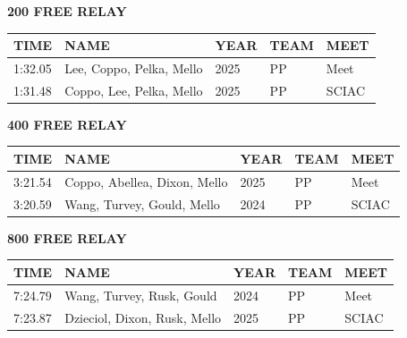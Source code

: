 \begin{table}[H]
\centering
\begin{minipage}[t]{0.6\textwidth}
\centering
\textbf{200 FREE RELAY}\\[0.1cm]
\begin{tabular}{@{}p{1.8cm}p{2.8cm}p{1.2cm}p{1.4cm}p{1.4cm}@{}}
\hline
    \textbf{TIME} & \textbf{NAME} & \textbf{YEAR} & \textbf{TEAM} & \textbf{MEET} \\
\hline
    1:32.05 & Lee, Coppo, Pelka, Mello & 2025 & PP & Meet \\
    1:31.48 & Coppo, Lee, Pelka, Mello & 2025 & PP & SCIAC \\
\hline
\end{tabular}
\end{minipage}
\end{table}

\begin{table}[H]
\centering
\begin{minipage}[t]{0.6\textwidth}
\centering
\textbf{400 FREE RELAY}\\[0.1cm]
\begin{tabular}{@{}p{1.8cm}p{2.8cm}p{1.2cm}p{1.4cm}p{1.4cm}@{}}
\hline
    \textbf{TIME} & \textbf{NAME} & \textbf{YEAR} & \textbf{TEAM} & \textbf{MEET} \\
\hline
    3:21.54 & Coppo, Abellea, Dixon, Mello & 2025 & PP & Meet \\
    3:20.59 & Wang, Turvey, Gould, Mello & 2024 & PP & SCIAC \\
\hline
\end{tabular}
\end{minipage}
\end{table}

\begin{table}[H]
\centering
\begin{minipage}[t]{0.6\textwidth}
\centering
\textbf{800 FREE RELAY}\\[0.1cm]
\begin{tabular}{@{}p{1.8cm}p{2.8cm}p{1.2cm}p{1.4cm}p{1.4cm}@{}}
\hline
    \textbf{TIME} & \textbf{NAME} & \textbf{YEAR} & \textbf{TEAM} & \textbf{MEET} \\
\hline
    7:24.79 & Wang, Turvey, Rusk, Gould & 2024 & PP & Meet \\
    7:23.87 & Dzieciol, Dixon, Rusk, Mello & 2025 & PP & SCIAC \\
\hline
\end{tabular}
\end{minipage}
\end{table}

